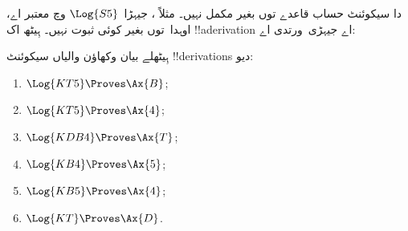 \documentclass[../../../include/open-logic-section]{subfiles}
\begin{document}
\begin{ex}
 دا سیکوئنٹ حساب \Cut{} قاعدے توں بغیر مکمل نہیں۔ مثلاً
، جیہڑا~$\Log{S5}$ وچ معتبر اے، اوہدا~\Cut توں
بغیر کوئی ثبوت نہیں۔ ہِیٹھ اک !!a{derivation} اے جیہڑی~\Cut ورتدی اے:
\begin{prooftree}
\end{prooftree}
\end{ex}

\begin{prob}
ہِیٹھلے بیان وکھاؤن والیاں سیکوئنٹ !!{derivation}s دیو:
  \begin{enumerate}
  \item $\Log{KT5} \Proves \Ax{B}$;
  \item $\Log{KT5} \Proves \Ax{4}$;
  \item $\Log{KDB4} \Proves \Ax{T}$;
  \item $\Log{KB4} \Proves \Ax{5}$;
  \item $\Log{KB5} \Proves \Ax{4}$;
  \item $\Log{KT} \Proves \Ax{D}$.
  \end{enumerate}
\end{prob}
\end{document}
